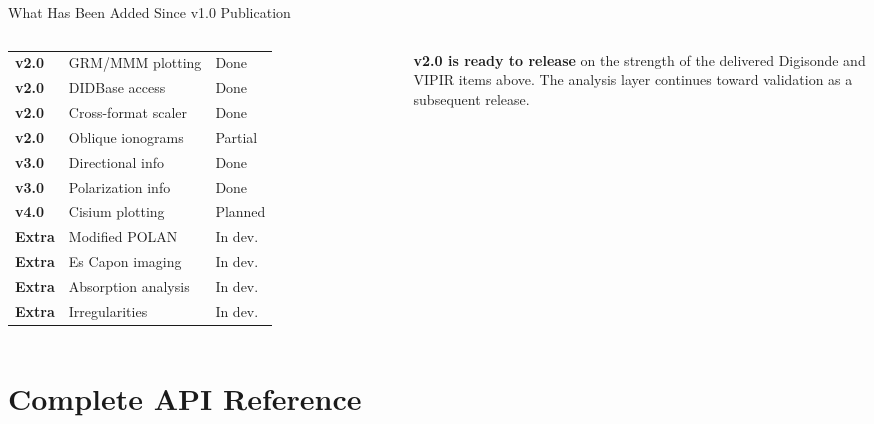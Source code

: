 \documentclass[aspectratio=169,11pt]{beamer}
\begin{document}
\begin{frame}{What Has Been Added Since v1.0 Publication}
\begin{columns}
\begin{tabular}{>{\bfseries}lll}
    v2.0 & GRM/MMM plotting & \textcolor{green!60!black}{Done} \\
    v2.0 & DIDBase access & \textcolor{green!60!black}{Done} \\
    v2.0 & Cross-format scaler & \textcolor{green!60!black}{Done} \\
    v2.0 & Oblique ionograms & \textcolor{orange!80!black}{Partial} \\
    v3.0 & Directional info & \textcolor{green!60!black}{Done} \\
    v3.0 & Polarization info & \textcolor{green!60!black}{Done} \\
    v4.0 & Cisium plotting & \textcolor{gray!60}{Planned} \\
    \midrule
    Extra & Modified POLAN & \textcolor{orange!80!black}{In dev.} \\
    Extra & Es Capon imaging & \textcolor{orange!80!black}{In dev.} \\
    Extra & Absorption analysis & \textcolor{orange!80!black}{In dev.} \\
    Extra & Irregularities & \textcolor{orange!80!black}{In dev.} \\
    \bottomrule
  \end{tabular}
  \vspace{0.3cm}
  \begin{alertblock}{}
    \scriptsize
    \textbf{v2.0 is ready to release} on the strength of the delivered
    Digisonde and VIPIR items above. The analysis layer continues toward
    validation as a subsequent release.
  \end{alertblock}
\end{columns}
\end{frame}

\section{Complete API Reference}
\end{document}
